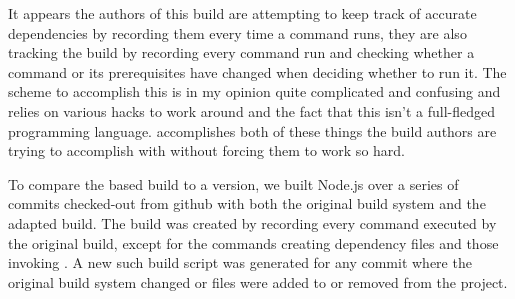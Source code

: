 
It appears the authors of this build are attempting to keep track of accurate dependencies by recording them every time a command runs, they are also tracking the build by recording every command run and checking whether a command or its prerequisites have changed when deciding whether to run it.  The scheme to accomplish this is in my opinion quite complicated and confusing and relies on various hacks to work around \Make and the fact that this isn't a full-fledged programming language.  \Rattle accomplishes both of these things the build authors are trying to accomplish with \Make without forcing them to work so hard.

To compare the \Make based build to a \Rattle version, we built Node.js over a series of commits checked-out from github with both the original build system and the adapted \Rattle build.  The \Rattle build was created by recording every command executed by the original build, except for the commands creating dependency files and those invoking \Make.  A new such \Rattle build script was generated for any commit where the original build system changed or files were added to or removed from the project.










